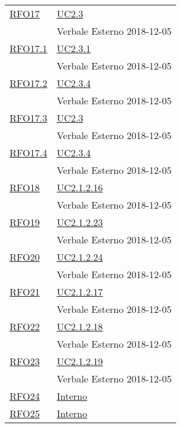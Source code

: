 \begin{longtable}{|>{\centering}m{5cm}|m{5cm}<{\centering}|}
	\hyperlink{RFO17}{RFO17} & \hyperref[UC2.3]{UC2.3}\\ & Verbale Esterno 2018-12-05\\ \hline
	
	\hyperlink{RFO17.1}{RFO17.1} & \hyperref[UC2.3.1]{UC2.3.1}\\ & Verbale Esterno 2018-12-05\\ \hline
	
	\hyperlink{RFO17.2}{RFO17.2} & \hyperref[UC2.3.4]{UC2.3.4}\\ & Verbale Esterno 2018-12-05\\ \hline
	
	\hyperlink{RFO17.3}{RFO17.3} & \hyperref[UC2.3]{UC2.3}\\ & Verbale Esterno 2018-12-05\\ \hline
	
	\hyperlink{RFO17.4}{RFO17.4} & \hyperref[UC2.3.4]{UC2.3.4}\\ & Verbale Esterno 2018-12-05\\ \hline
	
	\hyperlink{RFO18}{RFO18} & \hyperref[UC2.1.2.16]{UC2.1.2.16}\\ & Verbale Esterno 2018-12-05\\ \hline
	
	\hyperlink{RFO19}{RFO19} & \hyperref[UC2.1.2.23]{UC2.1.2.23}\\ & Verbale Esterno 2018-12-05\\ \hline
	
	\hyperlink{RFO20}{RFO20} & \hyperref[UC2.1.2.24]{UC2.1.2.24}\\ & Verbale Esterno 2018-12-05\\ \hline
	
	\hyperlink{RFO21}{RFO21} & \hyperref[UC2.1.2.17]{UC2.1.2.17}\\ & Verbale Esterno 2018-12-05\\ \hline
	
	\hyperlink{RFO22}{RFO22} & \hyperref[UC2.1.2.18]{UC2.1.2.18}\\ & Verbale Esterno 2018-12-05\\ \hline
	
	\hyperlink{RFO23}{RFO23} & \hyperref[UC2.1.2.19]{UC2.1.2.19}\\ & Verbale Esterno 2018-12-05\\ \hline
	
	\hyperlink{RFO24}{RFO24} & \hyperref[Interno]{Interno}\\ \hline
	
	\hyperlink{RFO25}{RFO25} & \hyperref[Interno]{Interno}\\ \hline
	

\end{longtable}
